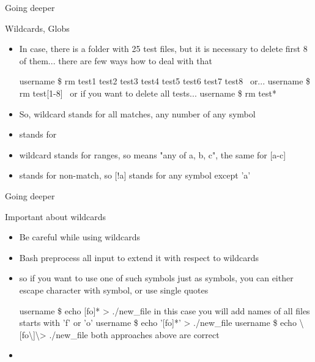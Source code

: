 \documentclass[usenames,dvipsnames,10pt,aspectratio=169]{beamer}
\begin{document}
\begin{frame}{Going deeper}

    {\Large Wildcards, Globs}
    \begin{itemize}
        \item In case, there is a folder with 25 test files, but it is necessary to delete first 8 of them... there are few ways how to deal with that
        \begin{examples}
        username \$ rm test1 test2 test3 test4 test5 test6 test7 test8 \newline
        \,\,\,or... \newline
        username \$ rm test[1-8] \newline
        \,\,\,or if you want to delete all tests... \newline
        username \$ rm test*
        \end{examples}
        \item So, \ex{*} wildcard stands for all matches, any number of any symbol
        \item {} stands for 
        \item \ex{[]} wildcard stands for ranges, so \ex{[abc]} means "any of a, b, c", the same for [a-c]
        \item \ex{!} stands for non-match, so [!a] stands for any symbol except 'a'
    \end{itemize}
\end{frame}

\begin{frame}{Going deeper}

    {\Large Important about wildcards}
    \begin{itemize}
        \item Be careful while using wildcards
        \item Bash preprocess all input to extend it with respect to wildcards
        \item so if you want to use one of such symbols just as symbols, you can either escape character with \ex{\textbackslash} symbol, or use single quotes
        \begin{examples}
        username \$ echo [fo]* > ./new\_file \newline in this case you will add names of all files starts with 'f' or 'o' \newline
        username \$ echo '[fo]*' > ./new\_file\newline
        username \$ echo \textbackslash [fo\textbackslash ]\textbackslash * > ./new\_file \newline
        both approaches above are correct
        \end{examples}
        \item {}
    \end{itemize}
\end{frame}
\end{document}
